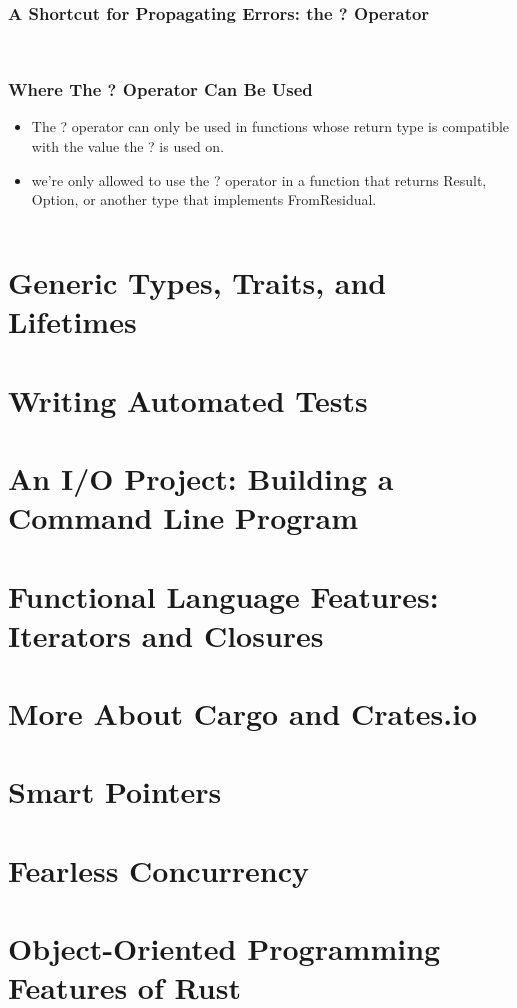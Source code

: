 \documentclass{beamer}
\begin{document}
\begin{frame}[fragile]
	\frametitle{A Shortcut for Propagating Errors: the ? Operator}
	\inputminted[fontsize=\scriptsize]{rust}{./code/result9.rs}
	
	\inputminted[fontsize=\scriptsize]{rust}{./code/result10.rs}
\end{frame}

\begin{frame}[fragile]
	\frametitle{Where The ? Operator Can Be Used}
		\begin{itemize}
			\item 	The ? operator can only be used in functions whose return type is compatible with the value the ? is used on.
			\item 	we’re only allowed to use the ? operator in a function that returns Result, Option, or another type that implements FromResidual.
		\end{itemize}
	
	\inputminted[fontsize=\scriptsize]{rust}{./code/result10.rs}
\end{frame}

\section{Generic Types, Traits, and Lifetimes}
\section{Writing Automated Tests}
\section{An I/O Project: Building a Command Line Program}
\section{Functional Language Features: Iterators and Closures}
\section{More About Cargo and Crates.io}
\section{Smart Pointers}
\section{Fearless Concurrency}
\section{Object-Oriented Programming Features of Rust}
\end{document}
